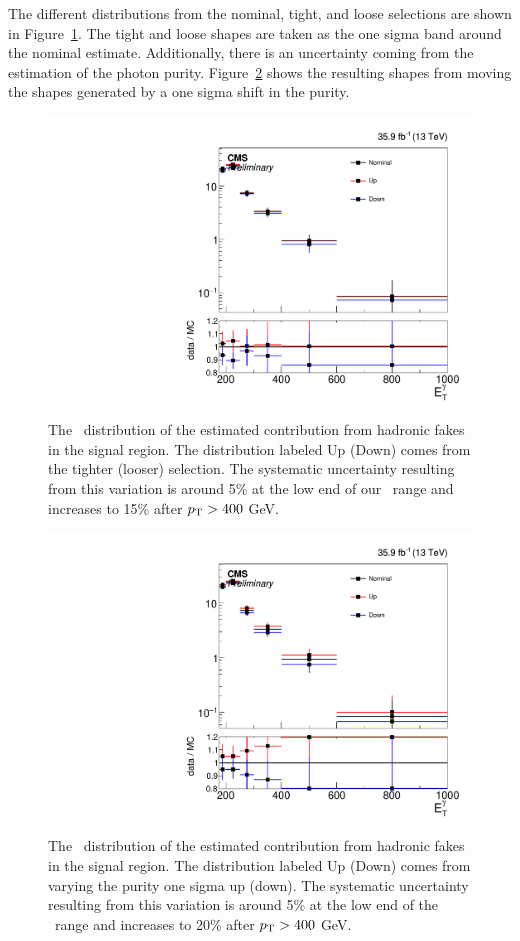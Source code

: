 The different distributions from the nominal, tight, and loose selections are shown in Figure~\ref{fig:hadronFakeShapes}. 
The tight and loose shapes are taken as the one sigma band around the nominal estimate. 
Additionally, there is an uncertainty coming from the estimation of the photon purity. 
Figure~\ref{fig:hadronFakePurity} shows the resulting shapes from moving the shapes generated by a one sigma shift in the purity.

\begin{figure}[htbp]
  \begin{center}
    \includegraphics[width=0.48\linewidth]{Analysis/Figures/hfake/shape_sample.pdf}
    \caption{
      The \pt\ distribution of the estimated contribution from hadronic fakes in the signal region. 
      The distribution labeled Up (Down) comes from the tighter (looser) selection. 
      The systematic uncertainty resulting from this variation is around 5\% at the low end of our \pt\ range and increases to 15\% after $p_{\mathrm{T}} > 400$ GeV.
    }
    \label{fig:hadronFakeShapes}
  \end{center}
\end{figure}

\begin{figure}[htbp]
  \begin{center}
    \includegraphics[width=0.48\linewidth]{Analysis/Figures/hfake/shape_purity.pdf}
    \caption{
      The \pt\ distribution of the estimated contribution from hadronic fakes in the signal region. 
      The distribution labeled Up (Down) comes from varying the purity one sigma up (down). 
      The systematic uncertainty resulting from this variation is around 5\% at the low end of the \pt\ range and increases to 20\% after $p_{\mathrm{T}} > 400$ GeV.
    }
    \label{fig:hadronFakePurity}
  \end{center}
\end{figure}


